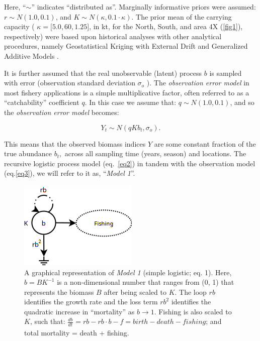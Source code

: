 \documentclass[
	letterpaper, %
	10pt, %
]{article}
\begin{document}
Here, ``$\sim$'' indicates ``distributed as''. Marginally informative priors were assumed: $r\sim N\left({1.0,0.1}\right)$, 
and $K\sim N\left({\kappa,0.1\cdot\kappa}\right)$. The prior mean of the carrying capacity (
$\kappa={\lbrack{5.0,60,1.25}\rbrack}$, in kt, for the North, South, and area 4X (\ref{fig1}), respectively) were based upon historical analyses with other analytical procedures, namely Geostatistical Kriging with External Drift and Generalized Additive Models \cite{Choi_et_al_2005b, Choi_2011}. 

It is further assumed that the real unobservable (latent) process $b$ is sampled with error (observation standard deviation 
$\sigma_{o}$ ). The \emph{observation error model} in most fishery applications is a simple
multiplicative factor, often referred to as a ``catchability'' coefficient 
$q$. In this case we assume that: $q\sim N\left({1.0,0.1}\right)$, and so the \emph{observation error model} becomes:


\begin{equation}
	\label{eq3}
	Y_{t}\sim N({q\mathit{Kb}_{t},\sigma_{o}}). 
	\end{equation}
 
This means that the observed biomass indices $Y$ are some constant fraction of the true abundance 
$b_{t},$ across all sampling time (years, season) and locations. The recursive logistic process model (eq.~\ref{eq2}) in tandem with the observation model (eq.\ref{eq3}), we will refer to it as, ``\emph{Model 1}''.
	
\begin{figure}
	\includegraphics[width=4.5 cm]{media/logistic_diagram.png}
	\caption{A graphical representation of \emph{Model 1} (simple logistic;
	eq. 1). Here, ${b=B}K^{-1}$ is a non-dimensional number that 
	ranges from (0, 1) that represents
	the biomass $B$ after being scaled to $K$. The loop $\mathit{rb}$
	identifies the growth rate and the loss term $rb^{2}$ identifies the
	quadratic increase in ``mortality'' as $b\rightarrow1$. Fishing is 
	also scaled to $K$, such that: 
	${\frac{\mathit{db}}{\mathit{dt}}_{}=\mathit{rb}}-\mathit{rb}\cdot{{b-f}={\mathit{birth}-\mathit{death}-\mathit{fishing}}}$; and total mortality = death + fishing.} \label{fig3}
	\end{figure}   
\end{document}

